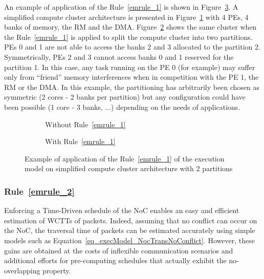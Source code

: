\documentclass[main.tex]{subfiles}
\begin{document}
\begin{example}
    An example of application of the Rule~\ref{emrule_1} is shown in
    Figure~\ref{fig_execModel_exampleRule1}. A simplified compute cluster
    architecture is presented in Figure~\ref{fig_execModel_exampleRule1_before}
    with 4 PEs, 4 banks of memory, the RM and the DMA.
    Figure~\ref{fig_execModel_exampleRule1_after} shows the same cluster when
    the Rule~\ref{emrule_1} is applied to split the compute cluster into two
    partitions. PEs 0 and 1 are not able to access the banks 2 and 3 allocated
    to the partition 2. Symmetrically, PEs 2 and 3 cannot access banks 0 and 1
    reserved for the partition 1. In this case, any task running on the PE 0
    (for example) may suffer only from ``friend'' memory interferences when in
    competition with the PE 1, the RM or the DMA. In this example, the
    partitioning has arbitrarily been chosen as symmetric (2 cores - 2 banks
    per partition) but any configuration could have been possible (1 core - 3
    banks, ...) depending on the needs of applications.
\end{example}

\begin{figure}
    \centering
    \begin{subfigure}[b]{0.45\linewidth}
    \centering
        \scalebox{0.7}{}
        \caption{Without Rule~\ref{emrule_1}}
        \label{fig_execModel_exampleRule1_before}
    \end{subfigure}
    \begin{subfigure}[b]{0.45\linewidth}
    \centering
        \scalebox{0.7}{}
        \caption{With Rule~\ref{emrule_1}}
        \label{fig_execModel_exampleRule1_after}
    \end{subfigure}
    \caption{Example of application of the Rule~\ref{emrule_1} of the execution model on simplified compute cluster architecture with 2 partitions}
    \label{fig_execModel_exampleRule1}
\end{figure}

\subsubsection{Rule~\ref{emrule_2}}
Enforcing a Time-Driven schedule of the NoC enables an easy and efficient
estimation of WCTTs of packets. Indeed, assuming that no conflict can occur on
the NoC, the traversal time of packets can be estimated accurately using simple
models such as Equation~\ref{eq_execModel_NocTransNoConflict}. However, these
gains are obtained at the costs of inflexible communication scenarios and
additional efforts for pre-computing schedules that actually exhibit the
no-overlapping property.
\end{document}
